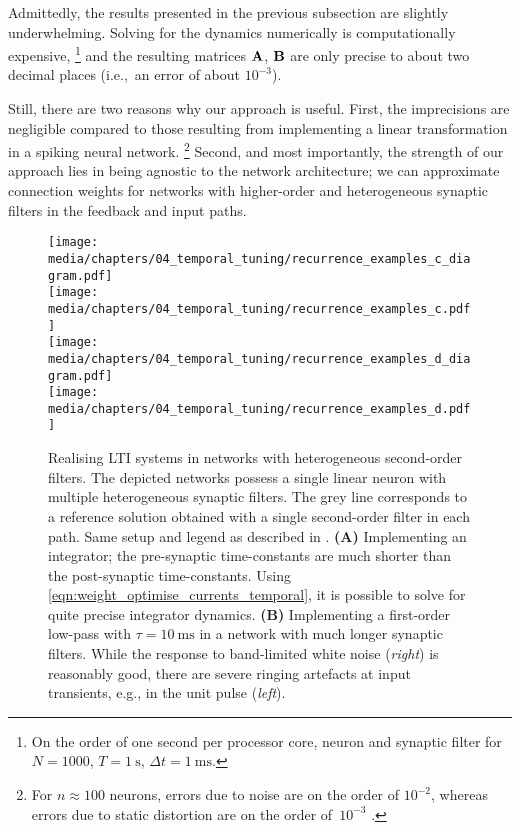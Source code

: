 Admittedly, the results presented in the previous subsection are slightly underwhelming.
Solving for the dynamics numerically is computationally expensive,%
\footnote{On the order of one second per processor core, neuron and synaptic filter for $N = {1000}$, $T = \SI{1}{\second}$, $\Delta t = \SI{1}{\milli\second}$.}
and the resulting matrices $\mathbf{A}$, $\mathbf{B}$ are only precise to about two decimal places (i.e.,~an error of about $10^{-3}$).

Still, there are two reasons why our approach is useful.
First, the imprecisions are negligible compared to those resulting from implementing a linear transformation in a spiking neural network.%
\footnote{For $n \approx 100$ neurons, errors due to noise are on the order of $10^{-2}$, whereas errors due to static distortion are on the order of~$10^{-3}$ \citep[cf.][Section~2.2.2 and Figure~2.6, note the squared errors]{eliasmith2003neural}.}
Second, and most importantly, the strength of our approach lies in being agnostic to the network architecture; we can approximate connection weights for networks with higher-order and heterogeneous synaptic filters in the feedback and input paths.

\begin{figure}[p]
	\centering
	\texttt{[image: media/chapters/04\_temporal\_tuning/recurrence\_examples\_c\_diagram.pdf]}\\[0.5em]
	\texttt{[image: media/chapters/04\_temporal\_tuning/recurrence\_examples\_c.pdf]}\\[1.45em]
	\texttt{[image: media/chapters/04\_temporal\_tuning/recurrence\_examples\_d\_diagram.pdf]}\\[0.5em]
	\texttt{[image: media/chapters/04\_temporal\_tuning/recurrence\_examples\_d.pdf]}
	{\label{fig:recurrence_examples_2a}}%
	{\label{fig:recurrence_examples_2b}}%
	\caption[Realising LTI systems in networks with heterogeneous second-order filters]{Realising LTI systems in networks with heterogeneous second-order filters.
	The depicted networks possess a single linear neuron with multiple heterogeneous synaptic filters.
	The grey line corresponds to a reference solution obtained with a single second-order filter in each path.
	Same setup and legend as described in .
	\textbf{(A)} Implementing an integrator; the pre-synaptic time-constants are much shorter than the post-synaptic time-constants.
	Using \cref{eqn:weight_optimise_currents_temporal}, it is possible to solve for quite precise integrator dynamics.
	\textbf{(B)} Implementing a first-order low-pass with $\tau = \SI{10}{\milli\second}$ in a network with much longer synaptic filters.
	While the response to band-limited white noise (\emph{right}) is reasonably good, there are severe ringing artefacts at input transients, e.g., in the unit pulse (\emph{left}).
	}
	\label{fig:recurrence_examples_2}
\end{figure}

